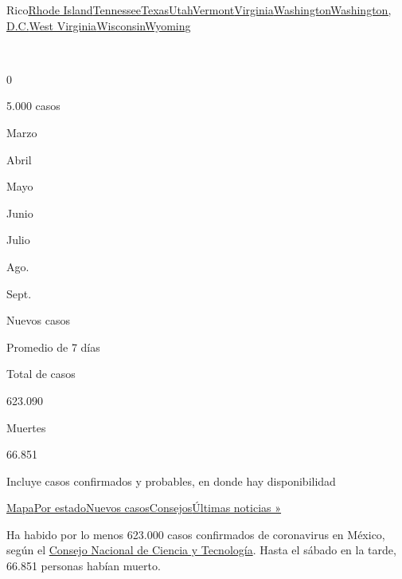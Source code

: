 {Rico}\href{https://www.nytimes3xbfgragh.onion/interactive/2020/us/rhode-island-coronavirus-cases.html}{Rhode
Island}\href{https://www.nytimes3xbfgragh.onion/interactive/2020/us/tennessee-coronavirus-cases.html}{Tennessee}\href{https://www.nytimes3xbfgragh.onion/interactive/2020/us/texas-coronavirus-cases.html}{Texas}\href{https://www.nytimes3xbfgragh.onion/interactive/2020/us/utah-coronavirus-cases.html}{Utah}\href{https://www.nytimes3xbfgragh.onion/interactive/2020/us/vermont-coronavirus-cases.html}{Vermont}\href{https://www.nytimes3xbfgragh.onion/interactive/2020/us/virginia-coronavirus-cases.html}{Virginia}\href{https://www.nytimes3xbfgragh.onion/interactive/2020/us/washington-coronavirus-cases.html}{Washington}\href{https://www.nytimes3xbfgragh.onion/interactive/2020/us/washington-dc-coronavirus-cases.html}{Washington,
D.C.}\href{https://www.nytimes3xbfgragh.onion/interactive/2020/us/west-virginia-coronavirus-cases.html}{West
Virginia}\href{https://www.nytimes3xbfgragh.onion/interactive/2020/us/wisconsin-coronavirus-cases.html}{Wisconsin}\href{https://www.nytimes3xbfgragh.onion/interactive/2020/us/wyoming-coronavirus-cases.html}{Wyoming}

~

0

5.000 casos

Marzo

Abril

Mayo

Junio

Julio

Ago.

Sept.

Nuevos casos

Promedio de 7 días

Total de casos

623.090

Muertes

66.851

Incluye casos confirmados y probables, en donde hay disponibilidad

\protect\hyperlink{map}{Mapa}\protect\hyperlink{states}{Por
estado}\protect\hyperlink{cases}{Nuevos
casos}\protect\hyperlink{tips}{Consejos}\href{https://www.nytimes3xbfgragh.onion/2020/09/05/world/covid-19-coronavirus.html}{Últimas
noticias »}

Ha habido por lo menos 623.000 casos confirmados de coronavirus en
México, según el \href{https://coronavirus.gob.mx/datos/}{Consejo
Nacional de Ciencia y Tecnología}. Hasta el sábado en la tarde, 66.851
personas habían muerto.

